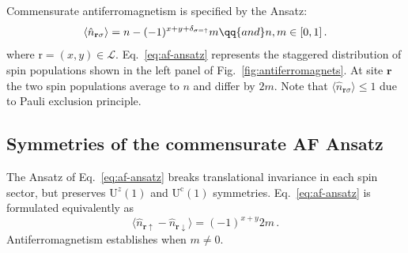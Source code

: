 Commensurate antiferromagnetism is specified by the Ansatz:
\begin{equation}\label{eq:af-ansatz}
	\langle \hat n_{\mathbf{r}\sigma} \rangle = n - (-1)^{x+y+\delta_{\sigma=\uparrow}} m
	\qq{and}
	n, m \in [0,1] \, .
\end{equation}
where $\mathrm{r}=(x,y) \in \mathcal{L}$. Eq.~\eqref{eq:af-ansatz} represents the staggered distribution of spin populations shown in the left panel of Fig.~\ref{fig:antiferromagnets}. At site $\mathbf{r}$ the two spin populations average to $n$ and differ by $2m$. Note that $\langle \hat n_{\mathbf{r}\sigma} \rangle \le 1$ due to Pauli exclusion principle.

\subsection{Symmetries of the commensurate AF Ansatz}

The Ansatz of Eq.~\eqref{eq:af-ansatz} breaks translational invariance in each spin sector, but preserves $\mathrm{U}^z(1)$ and $\mathrm{U}^\mathrm{c}(1)$ symmetries. Eq.~\eqref{eq:af-ansatz} is formulated equivalently as
\begin{equation}\label{eq:af-ansatz-2m}
	\langle \hat n_{\mathbf{r}\uparrow} - \hat n_{\mathbf{r}\downarrow} \rangle = (-1)^{x+y} 2m \, .
\end{equation}
Antiferromagnetism establishes when $m \neq 0$.

